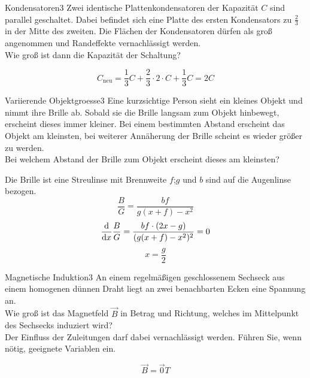 


\begin{problem}{Kondensatoren}{3}
Zwei identische Plattenkondensatoren der Kapazität $C$ sind parallel geschaltet. Dabei befindet sich eine Platte des ersten Kondensators zu $\frac{2}{3}$ in der Mitte des zweiten. Die Flächen der Kondensatoren dürfen als groß angenommen und Randeffekte vernachlässigt werden.\\
Wie groß ist dann die Kapazität der Schaltung?
\begin{solution}
\[
C_\mathrm{neu}=\frac{1}{3}C+\frac{2}{3}\cdot 2\cdot C+\frac{1}{3}C=2C
\]
\end{solution}
\end{problem}


\begin{problem}{Variierende Objektgroesse}{3}
Eine kurzsichtige Person sieht ein kleines Objekt und nimmt ihre Brille ab. Sobald sie die Brille langsam zum Objekt hinbewegt, erscheint dieses immer kleiner. Bei einem bestimmten Abstand erscheint das Objekt am kleinsten, bei weiterer Annäherung der Brille scheint es wieder größer zu werden.\\
Bei welchem Abstand der Brille zum Objekt erscheint dieses am kleinsten?
\begin{solution}
Die Brille ist eine Streulinse mit Brennweite $f$;\qquad $g$ und $b$ sind auf die Augenlinse bezogen.
\[
\frac{B}{G}=\frac{b f}{g(x+f)-x^2}
\]
\[
\frac{\mathrm{d}}{\mathrm{d} x}\frac{B}{G}=\frac{b f\cdot (2x-g)}{(g(x+f)-x^2)^2}=0
\]
\[
x=\frac{g}{2}
\]
\end{solution}
\end{problem}


\begin{problem}{Magnetische Induktion}{3}
An einem regelmäßigen geschlossenem Sechseck aus einem homogenen dünnen Draht liegt an zwei benachbarten Ecken eine Spannung an.\\
Wie groß ist das Magnetfeld $\vec{B}$ in Betrag und Richtung, welches im Mittelpunkt des Sechsecks induziert wird?\\
Der Einfluss der Zuleitungen darf dabei vernachlässigt werden. Führen Sie, wenn nötig, geeignete Variablen ein.
\begin{solution}
\[
\vec{B}=\vec{0}\unit{T}
\]
\end{solution}
\end{problem}


